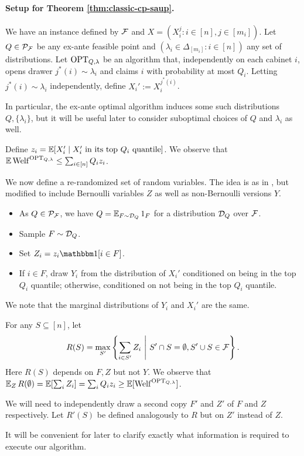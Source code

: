 \paragraph{Setup for Theorem \ref{thm:classic-cp-saup}.}
We have an instance defined by $\mathcal{F}$ and $X = (X_i^j : i \in [n], j \in [m_i])$.
Let $Q \in \mathcal{P}_{\mathcal{F}}$ be any ex-ante feasible point and $(\lambda_i \in \Delta_{[m_i]} : i \in [n])$ any set of distributions.
Let $\mathrm{OPT}_{Q,\lambda}$ be an algorithm that, independently on each cabinet $i$, opens drawer $j^*(i) \sim \lambda_i$ and claims $i$ with probability at most $Q_i$.
Letting $j^*(i) \sim \lambda_i$ independently, define $X_i' := X_i^{j^*(i)}$.

In particular, the ex-ante optimal algorithm induces some such distributions $Q,\{\lambda_i\}$, but it will be useful later to consider suboptimal choices of $Q$ and $\lambda_i$ as well.

Define $z_i = \operatorname*{\mathbb{E}}[ X_i' \mid \text{$X_i'$ in its top $Q_i$ quantile}]$.
We observe that $\operatorname*{\mathbb{E}} \mathrm{Welf}^{\mathrm{OPT}_{Q,\lambda}} \leq \sum_{i \in [n]} Q_i z_i$.

We now define a re-randomized set of random variables.
The idea is as in \citet{lee2018optimal}, but modified to include Bernoulli variables $Z$ as well as non-Bernoulli versions $Y$.
\begin{itemize}
  \item As $Q \in \mathcal{P}_{\mathcal{F}}$, we have $Q = \operatorname*{\mathbb{E}}_{F \sim \mathcal{D}_Q} 1_F$ for a distribution $\mathcal{D}_Q$ over $\mathcal{F}$.
  \item Sample $F \sim \mathcal{D}_Q$.
  \item Set $Z_i = z_i \Indic{i \in F}$.
  \item If $i \in F$, draw $Y_i$ from the distribution of $X_i'$ conditioned on being in the top $Q_i$ quantile; otherwise, conditioned on not being in the top $Q_i$ quantile.
\end{itemize}
We note that the marginal distributions of $Y_i$ and $X_i'$ are the same.

For any $S \subseteq [n]$, let
  \[ R(S) = \max_{S'} \left\{ \sum_{i \in S'} Z_i ~\middle|~ S' \cap S = \emptyset, S' \cup S \in \mathcal{F} \right\}. \]
Here $R(S)$ depends on $F,Z$ but not $Y$.
We observe that $\operatorname*{\mathbb{E}}_Z R(\emptyset) = \operatorname*{\mathbb{E}}[ \sum_i Z_i ] = \sum_i Q_i z_i \geq \operatorname*{\mathbb{E}}[ \mathrm{Welf}^{\mathrm{OPT}_{Q,\lambda}} ]$.

We will need to independently draw a second copy $F'$ and $Z'$ of $F$ and $Z$ respectively.
Let $R'(S)$ be defined analogously to $R$ but on $Z'$ instead of $Z$.

It will be convenient for later to clarify exactly what information is required to execute our algorithm.

